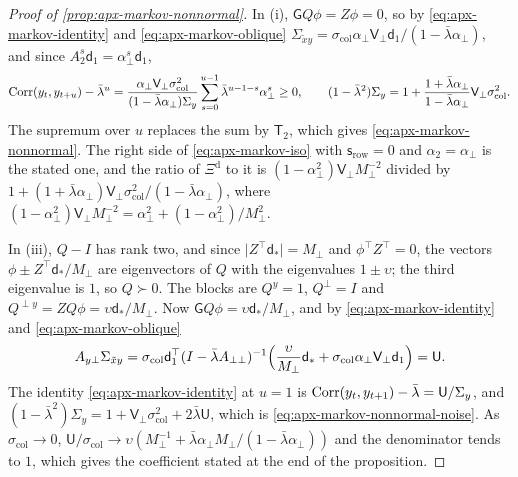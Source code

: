 \begin{proof}[Proof of \cref{prop:apx-markov-nonnormal}]
In (i), $\mathsf GQ\phi=Z\phi=0$, so by \eqref{eq:apx-markov-identity} and \eqref{eq:apx-markov-oblique} $\Sigma_{\tilde xy}=\sigma_{\mathrm{col}}\alpha_\perp\mathsf V_\perp\mathsf d_1/(1-\bar\lambda\alpha_\perp)$, and since $A_2^s\mathsf d_1=\alpha_\perp^s\mathsf d_1$,
\begin{equation*}
\operatorname{Corr}(y_t,y_{t+u})-\bar\lambda^u=\frac{\alpha_\perp\mathsf V_\perp\sigma_{\mathrm{col}}^2}{(1-\bar\lambda\alpha_\perp)\Sigma_y}\sum_{s=0}^{u-1}\bar\lambda^{u-1-s}\alpha_\perp^s\ge0,\qquad(1-\bar\lambda^2)\Sigma_y=1+\frac{1+\bar\lambda\alpha_\perp}{1-\bar\lambda\alpha_\perp}\mathsf V_\perp\sigma_{\mathrm{col}}^2 .
\end{equation*}
The supremum over $u$ replaces the sum by $\mathsf T_2$, which gives \eqref{eq:apx-markov-nonnormal}. The right side of \eqref{eq:apx-markov-iso} with $\mathsf s_{\mathrm{row}}=0$ and $\alpha_2=\alpha_\perp$ is the stated one, and the ratio of $\Xi^{\mathrm d}$ to it is $(1-\alpha_\perp^2)\mathsf V_\perp M_\perp^{-2}$ divided by $1+(1+\bar\lambda\alpha_\perp)\mathsf V_\perp\sigma_{\mathrm{col}}^2/(1-\bar\lambda\alpha_\perp)$, where $(1-\alpha_\perp^2)\mathsf V_\perp M_\perp^{-2}=\alpha_\perp^2+(1-\alpha_\perp^2)/M_\perp^2$.

In (iii), $Q-I$ has rank two, and since $\lvert Z^\top\mathsf d_\ast\rvert=M_\perp$ and $\phi^\top Z^\top=0$, the vectors $\phi\pm Z^\top\mathsf d_\ast/M_\perp$ are eigenvectors of $Q$ with the eigenvalues $1\pm\upsilon$; the third eigenvalue is $1$, so $Q\succ0$. The blocks are $Q^y=1$, $Q^\perp=I$ and $Q^{\perp y}=ZQ\phi=\upsilon\mathsf d_\ast/M_\perp$. Now $\mathsf GQ\phi=\upsilon\mathsf d_\ast/M_\perp$, and by \eqref{eq:apx-markov-identity} and \eqref{eq:apx-markov-oblique}
\begin{equation*}
A_{y\perp}\Sigma_{\tilde xy}=\sigma_{\mathrm{col}}\mathsf d_1^\top(I-\bar\lambda A_{\perp\perp})^{-1}\Bigl(\frac{\upsilon}{M_\perp}\mathsf d_\ast+\sigma_{\mathrm{col}}\alpha_\perp\mathsf V_\perp\mathsf d_1\Bigr)=\mathsf U .
\end{equation*}
The identity \eqref{eq:apx-markov-identity} at $u=1$ is $\operatorname{Corr}(y_t,y_{t+1})-\bar\lambda=\mathsf U/\Sigma_y$, and $(1-\bar\lambda^2)\Sigma_y=1+\mathsf V_\perp\sigma_{\mathrm{col}}^2+2\bar\lambda\mathsf U$, which is \eqref{eq:apx-markov-nonnormal-noise}. As $\sigma_{\mathrm{col}}\to0$, $\mathsf U/\sigma_{\mathrm{col}}\to\upsilon(M_\perp^{-1}+\bar\lambda\alpha_\perp M_\perp/(1-\bar\lambda\alpha_\perp))$ and the denominator tends to $1$, which gives the coefficient stated at the end of the proposition.


\end{proof}
